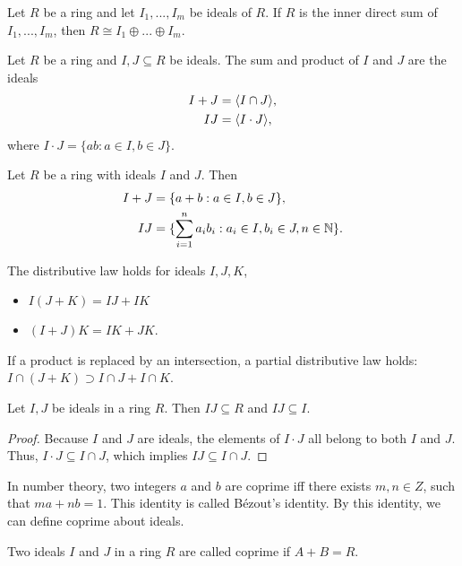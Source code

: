 \begin{theorem}{}{}
    Let $R$ be a ring and let $I_1,...,I_m$ be ideals of $R$. 
    If $R$ is the inner direct sum of $I_1,...,I_m$, then $R \cong I_1\oplus ... \oplus I_m$.
\end{theorem}


\begin{definition}{}{}
    Let $R$ be a ring and $I,J\subseteq R$ be ideals. The sum and product of $I$ and $J$ are the ideals
    \begin{align*}
        I+J&=\langle I\cap J \rangle,\\
        IJ&=\langle I\cdot J \rangle,
    \end{align*}
    where $I\cdot J=\{ab:a\in I,b\in J\}$.
\end{definition}

\begin{lemma}{}{}
    Let $R$ be a ring with ideals $I$ and $J$. Then
    \begin{align*}
        I+J &= \{a+b:a\in I,b\in J\},\\
        IJ &= \{\sum\limits_{i=1}^{n}a_ib_i:a_i\in I,b_i\in J,n\in\mathbb{N}\}. 
    \end{align*}
\end{lemma}

The distributive law holds for ideals $I,J,K$,
\begin{itemize}
    \item $I(J+K)=IJ+IK$
    \item $(I+J)K=IK+JK$.
\end{itemize}
If a product is replaced by an intersection, a partial distributive law holds: $I\cap(J+K)\supset I\cap J+I\cap K$.



\begin{proposition}{}{}
    Let $I,J$ be ideals in a ring $R$. 
    Then $IJ\subseteq R$ and $IJ\subseteq I$.
\end{proposition}
\begin{proof}
    Because $I$ and $J$ are ideals, 
    the elements of $I \cdot J$ all belong to both $I$ and $J$.
    Thus, $I\cdot J \subseteq I\cap J$, which implies $IJ \subseteq I \cap J$.
\end{proof}
In number theory, two integers $a$ and $b$ are coprime 
iff there exists $m, n \in Z$, such that 
$ma + nb = 1$. 
This identity is called B\'ezout's identity. 
By this identity, we can define coprime about ideals.



\begin{definition}{}{}
    Two ideals $I$ and $J$ in a ring $R$ are called coprime if $A+B=R$.
\end{definition}

